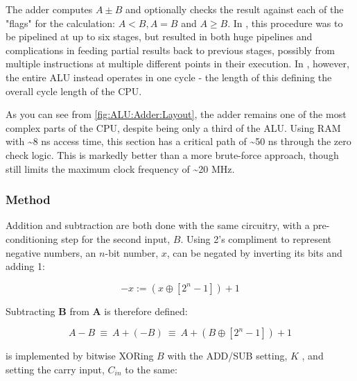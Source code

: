 \documentclass[a4paper, 11pt]{article}
\begin{document}
            The adder computes \(A \pm B\) and optionally checks the result 
            against each of the "flags" for the calculation: \(A < B, A = B\) 
            and \(A \ge B\). 
            In \oldlogo, this procedure was to be pipelined at up to six 
            stages, but resulted in both huge pipelines and complications in 
            feeding partial results back to previous stages, possibly from 
            multiple instructions at multiple different points in their 
            execution.
            In \logo, however, the entire ALU instead operates in one cycle - 
            the length of this defining the overall cycle length of the CPU.

            As you can see from \cref{fig:ALU:Adder:Layout}, the adder remains
            one of the most complex parts of the CPU, despite being only a 
            third of the ALU.
            Using RAM with \textasciitilde8 ns access time, this section has a critical path
            of \textasciitilde50 ns through the zero check logic.
            This is markedly better than a more brute-force approach, though
            still limits the maximum clock frequency of \textasciitilde 20 MHz.

            \subsubsection{Method}\label{sec:ALU:Adder:Method}

                Addition and subtraction are both done with the same circuitry, 
                with a pre-conditioning step for the second input, \(B\). 
                Using 2's compliment to represent negative numbers, an 
                \(n\)-bit number, \(x\), can be negated by inverting its 
                bits and adding 1:

                \begin{equation}
                    -x := (x \oplus [2^{n}-1]) + 1
                \end{equation}

                Subtracting \textbf{B} from \textbf{A} is therefore defined:

                \begin{equation}\label{eq:ALU:Adder:SubDef}
                    A - B \ \equiv\ 
                    A + (-B) \ 
                    \equiv\ A + (B \oplus [2^{n}-1]) + 1
                \end{equation}

                 is implemented by bitwise XORing 
                \(B\) with the ADD/SUB setting, \(K\)
                , and setting the carry input,
                $C_{in}$ to the same:
\end{document}
